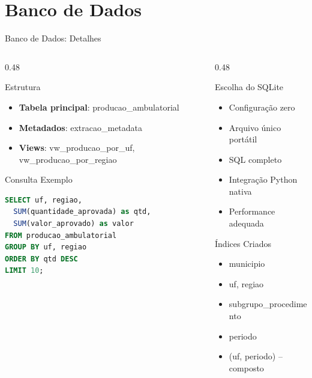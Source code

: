 \documentclass[aspectratio=169,10pt]{beamer}
\begin{document}
\section{Banco de Dados}
\begin{frame}{Banco de Dados: Detalhes}

\begin{columns}[T]
\begin{column}{0.48\textwidth}
    \begin{block}{Estrutura}
    \begin{itemize}
        \item \textbf{Tabela principal}: producao\_ambulatorial
        \item \textbf{Metadados}: extracao\_metadata
        \item \textbf{Views}: vw\_producao\_por\_uf, vw\_producao\_por\_regiao
    \end{itemize}
    \end{block}

    \begin{exampleblock}{Consulta Exemplo}
    \begin{lstlisting}[language=SQL]
SELECT uf, regiao,
  SUM(quantidade_aprovada) as qtd,
  SUM(valor_aprovado) as valor
FROM producao_ambulatorial
GROUP BY uf, regiao
ORDER BY qtd DESC
LIMIT 10;
    \end{lstlisting}
    \end{exampleblock}
\end{column}
\begin{column}{0.48\textwidth}
    \begin{block}{Escolha do SQLite}
    \begin{itemize}
        \item[\faCheck] Configuração zero
        \item[\faCheck] Arquivo único portátil
        \item[\faCheck] SQL completo
        \item[\faCheck] Integração Python nativa
        \item[\faCheck] Performance adequada
    \end{itemize}
    \end{block}

    \begin{alertblock}{Índices Criados}
    \begin{itemize}
        \item municipio
        \item uf, regiao
        \item subgrupo\_procedimento
        \item periodo
        \item (uf, periodo) -- composto
    \end{itemize}
    \end{alertblock}
\end{column}
\end{columns}

\end{frame}
\end{document}
